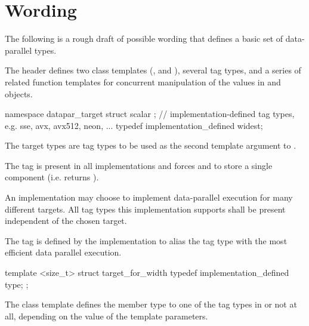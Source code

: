 \section{Wording}

The following is a rough draft of possible wording that defines a basic set of data-parallel types.

\begin{wgText}

  

  \pnum
  The header  defines two class templates (\datapar, and \mask), several tag types, and a series of related function templates for concurrent manipulation of the values in \datapar and \mask objects.

  \begin{itemdecl}
    namespace datapar_target {
      struct scalar {};
      // implementation-defined tag types, e.g. sse, avx, avx512, neon, ...
      typedef implementation_defined widest;
    }
  \end{itemdecl}
  \begin{itemdescr}
    \pnum
    The target types are tag types to be used as the second template argument to \datapar.

    \pnum
    The  tag is present in all implementations and forces \datapar and \mask to store a single component (i.e. \datapar{} returns ).

    \pnum
    An implementation may choose to implement data-parallel execution for many different targets.
    All tag types this implementation supports shall be present independent of the chosen target.

    \pnum
    The  tag is defined by the implementation to alias the tag type with the most efficient data parallel execution.
  \end{itemdescr}

  \begin{itemdecl}
    template <size_t> struct target_for_width {
      typedef implementation_defined type;
    };
  \end{itemdecl}
  \begin{itemdescr}
    \pnum
    The  class template defines the member type  to one of the tag types in  or not at all, depending on the value of the template parameters.


\end{itemdescr}
\end{wgText}
